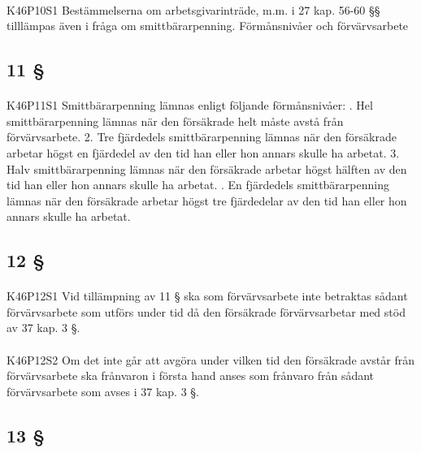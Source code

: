\documentclass[a4paper,notitlepage,openany,10pt]{book}
\begin{document}
\paragraph*{}
{\tiny K46P10S1}
Bestämmelserna om arbetsgivarinträde, m.m. i 27 kap. 56-60 §§ tilllämpas även i fråga om smittbärarpenning.
Förmånsnivåer och förvärvsarbete
\subsection*{11 §}
\paragraph*{}
{\tiny K46P11S1}
Smittbärarpenning lämnas enligt följande förmånsnivåer:
. Hel smittbärarpenning lämnas när den försäkrade helt måste avstå från förvärvsarbete. 2. Tre fjärdedels smittbärarpenning lämnas när den försäkrade arbetar högst en fjärdedel av den tid han eller hon annars skulle ha arbetat. 3. Halv smittbärarpenning lämnas när den försäkrade arbetar högst hälften av den tid han eller hon annars skulle ha arbetat.
. En fjärdedels smittbärarpenning lämnas när den försäkrade arbetar högst tre fjärdedelar av den tid han eller hon annars skulle ha arbetat.
\subsection*{12 §}
\paragraph*{}
{\tiny K46P12S1}
Vid tillämpning av 11 § ska som förvärvsarbete inte betraktas sådant förvärvsarbete som utförs under tid då den försäkrade förvärvsarbetar med stöd av 37 kap. 3 §.
\paragraph*{}
{\tiny K46P12S2}
Om det inte går att avgöra under vilken tid den försäkrade avstår från förvärvsarbete ska frånvaron i första hand anses som frånvaro från sådant förvärvsarbete som avses i 37 kap. 3 §.
\subsection*{13 §}
\end{document}
